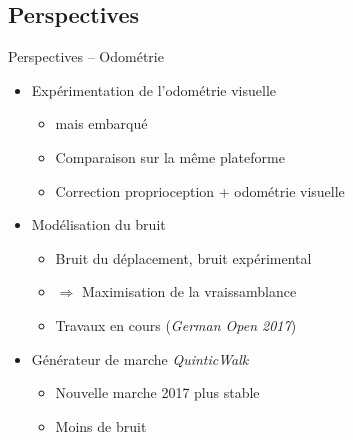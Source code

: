 \subsection{Perspectives}

\begin{frame}{Perspectives -- Odométrie}
    \begin{itemize}
        \setlength\itemsep{1.0em}
        \item Expérimentation de l'odométrie visuelle
            \begin{itemize}
                \item {} mais embarqué
                \item Comparaison sur la même plateforme
                \item Correction proprioception + odométrie visuelle
            \end{itemize}
        \item Modélisation du bruit
            \begin{itemize}
                \item Bruit du déplacement, bruit expérimental
                \item $\Rightarrow$ Maximisation de la vraissamblance
                \item Travaux en cours (\textit{German Open 2017})
            \end{itemize}
        \item Générateur de marche \textit{QuinticWalk}
            \begin{itemize}
                \item Nouvelle marche 2017 plus stable
                \item Moins de bruit
            \end{itemize}
    \end{itemize}
\end{frame}
